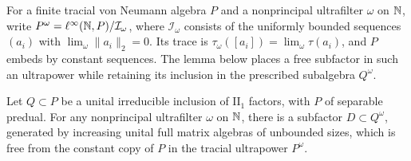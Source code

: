 For a finite tracial von Neumann algebra $P$ and a nonprincipal
ultrafilter $\omega$ on $\mathbb N$, write
$P^\omega=\ell^\infty(\mathbb N,P)/\mathcal I_\omega$, where
$\mathcal I_\omega$ consists of the uniformly bounded sequences
$(a_i)$ with $\lim_\omega\|a_i\|_2=0$. Its trace is
$\tau_\omega([a_i])=\lim_\omega\tau(a_i)$, and $P$ embeds by
constant sequences. The lemma below places a free subfactor in such
an ultrapower while retaining its inclusion in the prescribed
subalgebra $Q^\omega$.

\begin{lemma}
\label{lem:free-position}
Let \(Q\subset P\) be a unital irreducible inclusion of
\(\mathrm{II}_1\) factors, with \(P\) of separable predual.  For any
nonprincipal ultrafilter \(\omega\) on \(\mathbb N\), there is a subfactor
\(D\subset Q^\omega\), generated by increasing unital full matrix
algebras of unbounded sizes, which is free from the constant copy of
\(P\) in the tracial ultrapower \(P^\omega\).
\end{lemma}

